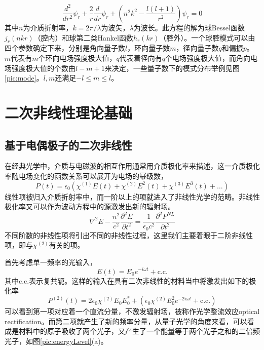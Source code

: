 \documentclass[UTF8,a4paper,cs4size,hyperref]{ctexart}
\begin{document}
\begin{equation}
\frac{d^2}{dr^2}\psi_r+\frac{2}{r}\frac{d}{dr}\psi_r+(n^2k^2-\frac{l(l+1)}{r^2})\psi_r = 0
\end{equation}
其中$n$为介质折射率，$k=2\pi/\lambda$为波矢，$\lambda$为波长。此方程的解为球Bessel函数$j_r(nkr)$（腔内）和球第二类Hankel函数$h_r(kr)$（腔外）。一个球腔模式可以由四个参数确定下来，分别是角向量子数$l$，环向量子数$m$，径向量子数$q$和偏振$p$。$m$代表有$m$个环向电场强度极大值，$q$代表着径向有$q$个电场强度极大值，而角向电场强度极大值的个数由$l-m+1$来决定，一些量子数下的模式分布举例见图\ref{pic:mode}。$l, m$还满足$-l\le m\le l$。


\newpage
\section{二次非线性理论基础}
\label{sec:nonlinearTheo}
\subsection{基于电偶极子的二次非线性}
\label{sec:dipole}
在经典光学中，介质与电磁波的相互作用通常用介质极化率来描述，这一介质极化率随电场变化的函数关系可以展开为电场的幂级数，
\begin{equation}
P(t) = \epsilon_0(\chi^{(1)}E(t)+\chi^{(2)}E^2(t)+\chi^{(3)}E^3(t)+\dots)
\end{equation}
线性项被归入介质折射率中，而一阶以上的项就进入了非线性光学的范畴。非线性极化率又可以作为波动方程中的源激发出新的辐射场。
\begin{equation}
\nabla^2E-\frac{n^2}{c^2}\frac{\partial^2E}{\partial t^2} = \frac{1}{\epsilon_0c^2}\frac{\partial^2P^{NL}}{\partial t^2}
\label{eq:wave}
\end{equation}
不同阶数的非线性项将引出不同的非线性过程，这里我们主要着眼于二阶非线性项，即与$\chi^{(2)}$有关的项。

首先考虑单一频率的光输入，
\begin{equation}
E(t) = E_0e^{-i\omega t}+\textrm{c.c.} 
\end{equation}
	其中c.c.表示复共轭。这样的输入在具有二次非线性的材料当中将激发出如下的极化率
\begin{equation}
P^{(2)}(t) = 2\epsilon_0\chi^{(2)}E_0E_0^*+(\epsilon_0\chi^{(2)}E_0^2e^{-2i\omega t}+\textrm{c.c.})
\end{equation}
可以看到第一项对应着一个直流分量，不激发辐射场，被称作光学整流效应optical rectification。而第二项就产生了新的频率分量，从量子光学的角度来看，可以看成是材料中的原子吸收了两个光子，又产生了一个能量等于两个光子之和的二倍频光子，如图\ref{pic:energyLevel}(a)。
\end{document}
